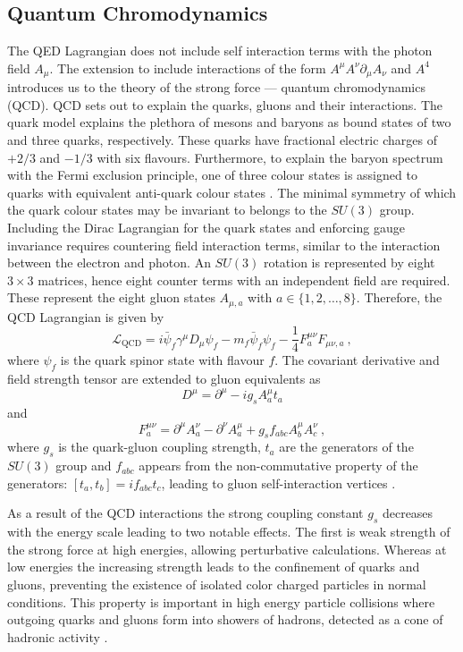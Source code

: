\subsection{Quantum Chromodynamics}

The QED Lagrangian does not include self interaction terms with the photon field $A_\mu$. The extension to include interactions of the form $A^{\mu}A^\nu\partial_\mu A_\nu$ and $A^4$ introduces us to the theory of the strong force --- quantum chromodynamics (QCD). QCD sets out to explain the quarks, gluons and their interactions. The quark model explains the plethora of mesons and baryons as bound states of two and three quarks, respectively.  These quarks have fractional electric charges of $+2/3$ and $-1/3$ with six flavours. Furthermore, to explain the baryon spectrum with the Fermi exclusion principle, one of three colour states is assigned to quarks with equivalent anti-quark colour states \cite{Peskin:1995ev}. The minimal symmetry of which the quark colour states may be invariant to belongs to the $SU(3)$ group.  Including the Dirac Lagrangian for the quark states and enforcing gauge invariance requires countering field interaction terms, similar to the interaction between the electron and photon. An $SU(3)$ rotation is represented by eight $3\times 3$ matrices, hence eight counter terms with an independent field are required. These represent the eight gluon states $A_{\mu,a}$ with $a\in\{1,2,\ldots,8\}$. Therefore, the QCD Lagrangian is given by
%
\begin{equation}
    \mathcal{L}_{\mathrm{QCD}} = i\bar{\psi}_f\gamma^{\mu}D_\mu\psi_f - m_f\bar{\psi}_f\psi_f - \frac{1}{4}F^{\mu\nu}_a F_{\mu\nu,a}\ ,
\end{equation}
%
where $\psi_f$ is the quark spinor state with flavour $f$. The covariant derivative and field strength tensor are extended to gluon equivalents as
%
\begin{equation}
    D^{\mu} = \partial^\mu - i g_{s}A^\mu_a t_a
\end{equation}
%
and
%
\begin{equation}
    F^{\mu\nu}_a = \partial^\mu A^\nu_a - \partial^\nu A^\mu_a + g_{s} f_{abc}A^\mu_b A^\nu_c\ ,
\end{equation}
%
where $g_{s}$ is the quark-gluon coupling strength, $t_a$ are the generators of the $SU(3)$ group and $f_{abc}$ appears from the non-commutative property of the generators: $[t_a,t_b]=if_{abc}t_c$, leading to gluon self-interaction vertices \cite{Peskin:1995ev}.

As a result of the QCD interactions the strong coupling constant $g_s$ decreases with the energy scale leading to two notable effects. The first is weak strength of the strong force at high energies, allowing perturbative calculations. Whereas at low energies the increasing strength leads to the confinement of quarks and gluons, preventing the existence of isolated color charged particles in normal conditions. This property is important in high energy particle collisions where outgoing quarks and gluons form into showers of hadrons, detected as a cone of hadronic activity \cite{Peskin:1995ev}.


